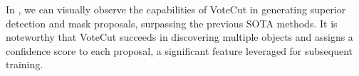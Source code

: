

In , we can visually observe the capabilities of VoteCut in generating superior detection and mask proposals, surpassing the previous SOTA methods. It is noteworthy that VoteCut succeeds in discovering multiple objects and assigns a confidence score to each proposal, a significant feature leveraged for subsequent training.

